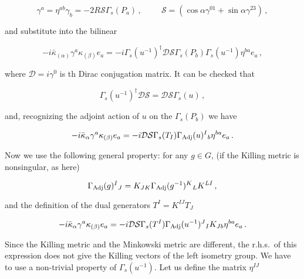 \documentclass[12pt,a4paper]{article}
\begin{document}
\begin{equation}
\gamma^{a}= \eta^{ab}\gamma_{b}=-2R\mathcal{S}\Gamma_{s}(P_{a})\, ,
\hspace{1cm}
\mathcal{S}= (\cos{\alpha} \gamma^{01} +\sin{\alpha}\gamma^{23})\, ,   
\end{equation}

\noindent 
and substitute into the bilinear 

\begin{equation}
-i\bar{\kappa}_{(\alpha)}\gamma^{a}\kappa_{(\beta)}e_{a} = 
-i\Gamma_{s}(u^{-1})^{\dagger}\mathcal{D}\mathcal{S}\Gamma_{s}(P_{b})
\Gamma_{s}(u^{-1})\eta^{ba}e_{a}\, ,  
\end{equation}

\noindent
where $\mathcal{D}=i\gamma^{0}$ is th Dirac conjugation matrix. It can
be checked that

\begin{equation}
\Gamma_{s}(u^{-1})^{\dagger}\mathcal{D}\mathcal{S} =
\mathcal{D}\mathcal{S}\Gamma_{s}(u)\, ,
\end{equation}

\noindent
and, recognizing the adjoint action of $u$ on the $\Gamma_{s}(P_{b})$
we have

\begin{equation}
-i\bar{\kappa}_{\alpha}\gamma^{a}\kappa_{(\beta)}e_{a}
=-i\mathcal{D}\mathcal{S}\Gamma_{s}(T_{I})\Gamma_{\rm Adj}(u)^{I}{}_{b}
\eta^{ba}e_{a}\, .   
\end{equation}

\noindent
Now we use the following general property: for any $g\in G$, (if the
Killing metric is nonsingular, as here)

\begin{equation}
\Gamma_{\rm Adj}(g)^{I}{}_{J} = 
K_{JK}\Gamma_{\rm Adj}(g^{-1})^{K}{}_{L} K^{LI}\, ,  
\end{equation}

\noindent
and the definition of the dual generators $T^{I}= K^{IJ}T_{J}$

\begin{equation}
-i\bar{\kappa}_{\alpha}\gamma^{a}\kappa_{(\beta)}e_{a}
=-i\mathcal{D}\mathcal{S}\Gamma_{s}(T^{I})
\Gamma_{\rm Adj}(u^{-1})^{J}{}_{I}K_{Jb}\eta^{ba}e_{a}\, .   
\end{equation}

Since the Killing metric and the Minkowski metric are different, the
r.h.s.~of this expression does not give the Killing vectors of the
left isometry group. We have to use a non-trivial property of
$\Gamma_{s}(u^{-1})$. Let us define the matrix $\eta^{IJ}$
\end{document}
